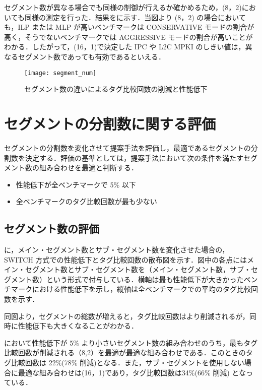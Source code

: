 セグメント数が異なる場合でも同様の制御が行えるか確かめるため，(8，2)においても同様の測定を行った．結果をに示す．当図より (8，2) の場合においても，ILP または MLP が高いベンチマークは CONSERVATIVE モードの割合が高く，そうでないベンチマークでは AGGRESSIVE モードの割合が高いことがわかる．したがって，(16，1)で決定した IPC や L2C MPKI のしきい値は，異なるセグメント数であっても有効であるといえる．


\begin{figure}[htb]
  \centering
  \texttt{[image: segment\_num]}
  \caption{セグメント数の違いによるタグ比較回数の削減と性能低下}
  \label{fig:segment_num}
\end{figure}

\section{セグメントの分割数に関する評価}
\label{sec:ipc_comp}
セグメントの分割数を変化させて提案手法を評価し，最適であるセグメントの分割数を決定する．評価の基準としては，提案手法において次の条件を満たすセグメント数の組み合わせを最適と判断する．
\begin{itemize}
  \item 性能低下が全ベンチマークで 5\% 以下
  \item 全ベンチマークのタグ比較回数が最も少ない
\end{itemize}

\subsection{セグメント数の評価}
に，メイン・セグメント数とサブ・セグメント数を変化させた場合の，SWITCH 方式での性能低下とタグ比較回数の散布図を示す．図中の各点にはメイン・セグメント数とサブ・セグメント数を（メイン・セグメント数，サブ・セグメント数）という形式で付与している．横軸は最も性能低下が大きかったベンチマークにおける性能低下を示し，縦軸は全ベンチマークでの平均のタグ比較回数を示す．

同図より，セグメントの総数が増えると，タグ比較回数はより削減されるが，同時に性能低下も大きくなることがわかる．

において性能低下が 5\% より小さいセグメント数の組み合わせのうち，最もタグ比較回数が削減される（8,2）を最適が最適な組み合わせである．このときのタグ比較回数は 22\%(78\% 削減)となる．また，サブ・セグメントを使用しない場合に最適な組み合わせは(16，1)であり，タグ比較回数は34\%(66\% 削減) となっている．

